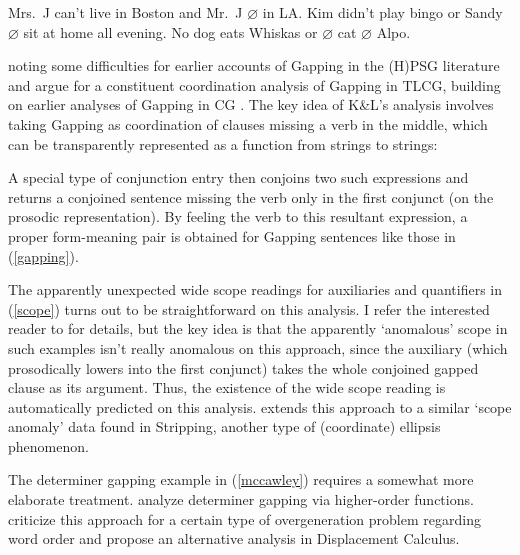 \documentclass[output=paper]{langsci/langscibook}
\begin{document}
\begin{exe}
 \ex\label{scope}
  \begin{xlist}
 \ex\label{mrj1}
    Mrs.\ J can't live in Boston and Mr.\ J  \ensuremath{\varnothing}  in LA.
 \ex\label{ex2b}
    Kim didn't play bingo or Sandy  \ensuremath{\varnothing}  sit at home all evening.
 \ex\label{mccawley}
    No dog eats Whiskas or  \ensuremath{\varnothing}  cat  \ensuremath{\varnothing}  Alpo.
  \end{xlist}
\end{exe}

\citet{kubota-levine-nels,kubota-levine-gapping} noting some difficulties
for earlier accounts of Gapping in the (H)PSG literature and argue
for a constituent coordination analysis of Gapping in TLCG, building
on earlier analyses of Gapping in CG 
\citep{Steedman90a-u-kopiert,hendriks95,morrillsolias93}. The key idea of
K\&L's analysis involves taking Gapping as coordination of clauses
missing a verb in the middle, which can be transparently represented
as a function from strings to strings:

\begin{exe}
 \ex\label{}
  \pt{ \ensuremath{\lambda} \ensuremath{\greekp}. leslie \ensuremath{\circ}\xspace \ensuremath{\greekp} \ensuremath{\circ}\xspace a \ensuremath{\circ}\xspace cd }
\end{exe}
A special type of conjunction entry then conjoins two such expressions
and returns a conjoined sentence missing the verb only in the first
conjunct (on the prosodic representation). By feeling the verb to
this resultant expression,  a proper form-meaning  pair is obtained
for Gapping sentences like those in (\ref{gapping}).

The apparently unexpected wide scope readings for auxiliaries and
quantifiers in (\ref{scope}) turns out to be straightforward on this
analysis. I refer the interested reader to \citet{kubota-levine-gapping} for
details, but the key idea is that the apparently `anomalous' scope in
such examples isn't really anomalous on this approach, since the
auxiliary (which prosodically lowers into the first conjunct) takes
the whole conjoined gapped clause as its argument. Thus, the existence
of the wide scope reading is automatically predicted on this analysis.
\citet{puthawala2018} extends this approach to a similar `scope anomaly'
data found in Stripping, another type of (coordinate) ellipsis
phenomenon.

The determiner gapping example in (\ref{mccawley}) requires a somewhat more
elaborate treatment. \citet{kubota-levine-gapping} analyze determiner
gapping via higher-order functions. \citet{morrillvalentin16} criticize this
approach for a certain type of overgeneration problem regarding word
order and propose an alternative analysis in Displacement Calculus.
\end{document}
